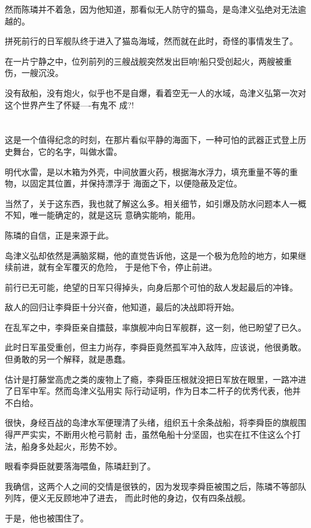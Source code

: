 \documentclass[11pt,a4paper,onecolumn]{article}
\begin{document}
然而陈璘并不着急，因为他知道，那看似无人防守的猫岛，是岛津义弘绝对无法逾越的。

拼死前行的日军舰队终于进入了猫岛海域，然而就在此时，奇怪的事情发生了。

在一片宁静之中，位列前列的三艘战舰突然发出巨响!船只受创起火，两艘被重伤，一艘沉没。

没有敌船，没有炮火，似乎也不是自爆，看着空无一人的水域，岛津义弘第一次对这个世界产生了怀疑----有鬼不
成?!

\section[\thesection]{}

这是一个值得纪念的时刻，在那片看似平静的海面下，一种可怕的武器正式登上历史舞台，它的名字，叫做水雷。

明代水雷，是以木箱为外壳，中间放置火药，根据海水浮力，填充重量不等的重物，以固定其位置，并保持漂浮于
海面之下，以便隐蔽及定位。

当然了，关于这东西，我也就了解这么多。相关细节，如引爆及防水问题本人一概不知，唯一能确定的，就是这玩
意确实能响，能用。

陈璘的自信，正是来源于此。

岛津义弘却依然是满脑浆糊，他的直觉告诉他，这是一个极为危险的地方，如果继续前进，就有全军覆灭的危险，
于是他下令，停止前进。

前行已无可能，绝望的日军只得掉头，向身后那个可怕的敌人发起最后的冲锋。

敌人的回归让李舜臣十分兴奋，他知道，最后的决战即将开始。

在乱军之中，李舜臣亲自擂鼓，率旗舰冲向日军舰群，这一刻，他已盼望了已久。

此时日军虽受重创，但主力尚存，李舜臣竟然孤军冲入敌阵，应该说，他很勇敢。但勇敢的另一个解释，就是愚蠢。

估计是打藤堂高虎之类的废物上了瘾，李舜臣压根就没把日军放在眼里，一路冲进了日军中军。然而岛津义弘用实
际行动证明，作为日本二杆子的优秀代表，他并不白给。

很快，身经百战的岛津水军便理清了头绪，组织五十余条战船，将李舜臣的旗舰围得严严实实，不断用火枪弓箭射
击，虽然龟船十分坚固，也实在扛不住这么个打法，船身多处起火，形势不妙。

眼看李舜臣就要落海喂鱼，陈璘赶到了。

我确信，这两个人之间的交情是很铁的，因为发现李舜臣被围之后，陈璘不等部队列阵，便义无反顾地冲了进去，
而此时他的身边，仅有四条战舰。

于是，他也被围住了。
\end{document}
